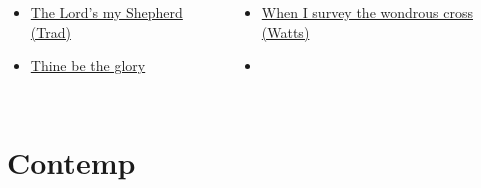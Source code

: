 \documentclass{beamer}
\begin{document}
            \begin{frame}[t]
            \begin{columns}[t]
        \begin{itemize}
    \item \hyperlink{The Lord's my Shepherd['Psalm 23'](Trad)}{The Lord's my Shepherd (Trad)} \phantom{ 1 1 1}
    \item \hyperlink{Thine be the glory[]}{Thine be the glory } \phantom{ 1 1 1 1 1 1 1 1}
\end{itemize}
        \begin{itemize}
            \item \hyperlink{When I survey the wondrous cross[](Watts)}{When I survey the wondrous cross (Watts)} \phantom{}
    \item[] \phantom{1}\end{itemize}


\end{columns}

\end{frame}
\section{Contemp}
\end{document}
